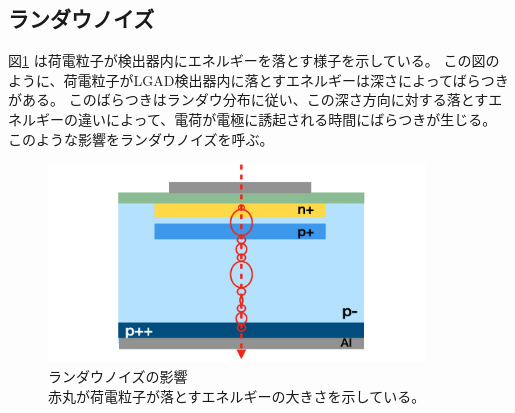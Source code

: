 \subsection{ランダウノイズ}
図\ref{fg:Landaunoise} は荷電粒子が検出器内にエネルギーを落とす様子を示している。
この図のように、荷電粒子がLGAD検出器内に落とすエネルギーは深さによってばらつきがある。
このばらつきはランダウ分布に従い、この深さ方向に対する落とすエネルギーの違いによって、電荷が電極に誘起される時間にばらつきが生じる。
このような影響をランダウノイズを呼ぶ。

\begin{figure}[h]
    \centering
    \includegraphics[width=10cm]{fig/ch3/Landaunoise.png}
    \caption[ランダウノイズの影響]{ランダウノイズの影響\\赤丸が荷電粒子が落とすエネルギーの大きさを示している。}
    \label{fg:Landaunoise}
\end{figure}